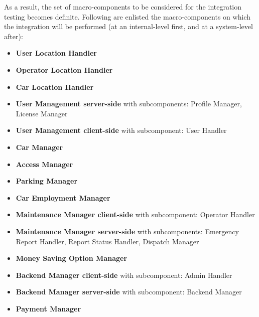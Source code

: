 	As a result, the set of macro-components to be considered for the integration testing becomes definite. Following are enlisted the macro-components on which the integration will be performed (at an internal-level first, and at a system-level after):
	\begin{itemize}
		\item \textbf{User Location Handler}
		\item \textbf{Operator Location Handler}
		\item \textbf{Car Location Handler}
		\item \textbf{User Management server-side} with subcomponents: Profile Manager, License Manager
		\item \textbf{User Management client-side} with subcomponent: User Handler
		\item \textbf{Car Manager}
		\item \textbf{Access Manager}
		\item \textbf{Parking Manager}
		\item \textbf{Car Employment Manager}
		\item \textbf{Maintenance Manager client-side} with subcomponent: Operator Handler
		\item \textbf{Maintenance Manager server-side} with subcomponents: Emergency Report Handler, Report Status Handler, Dispatch Manager
		\item \textbf{Money Saving Option Manager}
		\item \textbf{Backend Manager client-side} with subcomponent: Admin Handler
		\item \textbf{Backend Manager server-side} with subcomponent: Backend Manager
		\item \textbf{Payment Manager}
	\end{itemize}
	

